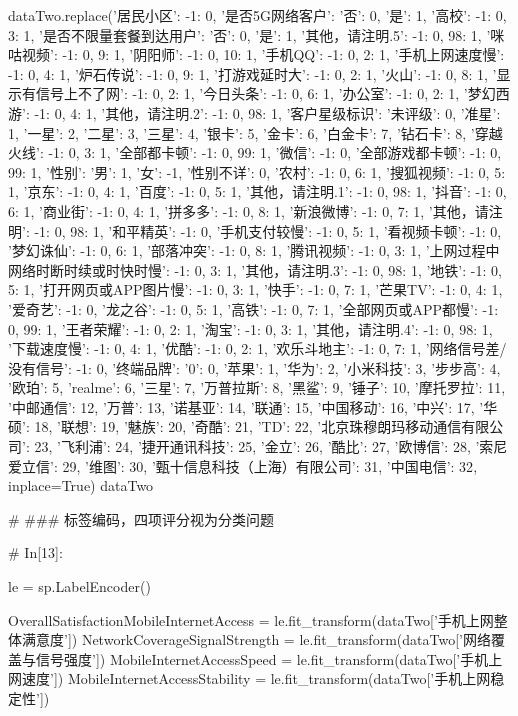 \documentclass{MathorCupmodeling}
\begin{document}
\begin{python}
	
	dataTwo.replace({'居民小区': {-1: 0}, '是否5G网络客户': {'否': 0, '是': 1}, '高校': {-1: 0, 3: 1}, '是否不限量套餐到达用户': {'否': 0, '是': 1}, '其他，请注明.5': {-1: 0, 98: 1}, '咪咕视频': {-1: 0, 9: 1}, '阴阳师': {-1: 0, 10: 1}, '手机QQ': {-1: 0, 2: 1}, '手机上网速度慢': {-1: 0, 4: 1}, '炉石传说': {-1: 0, 9: 1}, '打游戏延时大': {-1: 0, 2: 1}, '火山': {-1: 0, 8: 1}, '显示有信号上不了网': {-1: 0, 2: 1}, '今日头条': {-1: 0, 6: 1}, '办公室': {-1: 0, 2: 1}, '梦幻西游': {-1: 0, 4: 1}, '其他，请注明.2': {-1: 0, 98: 1}, '客户星级标识': {'未评级': 0, '准星': 1, '一星': 2, '二星': 3, '三星': 4, '银卡': 5, '金卡': 6, '白金卡': 7, '钻石卡': 8}, '穿越火线': {-1: 0, 3: 1}, '全部都卡顿': {-1: 0, 99: 1}, '微信': {-1: 0}, '全部游戏都卡顿': {-1: 0, 99: 1}, '性别': {'男': 1, '女': -1, '性别不详': 0}, '农村': {-1: 0, 6: 1}, '搜狐视频': {-1: 0, 5: 1}, '京东': {-1: 0, 4: 1}, '百度': {-1: 0, 5: 1}, '其他，请注明.1': {-1: 0, 98: 1}, '抖音': {-1: 0, 6: 1}, '商业街': {-1: 0, 4: 1}, '拼多多': {-1: 0, 8: 1}, '新浪微博': {-1: 0, 7: 1}, '其他，请注明': {-1: 0, 98: 1}, '和平精英': {-1: 0}, '手机支付较慢': {-1: 0, 5: 1}, '看视频卡顿': {-1: 0}, '梦幻诛仙': {-1: 0, 6: 1}, '部落冲突': {-1: 0, 8: 1}, '腾讯视频': {-1: 0, 3: 1}, '上网过程中网络时断时续或时快时慢': {-1: 0, 3: 1}, '其他，请注明.3': {-1: 0, 98: 1}, '地铁': {-1: 0, 5: 1}, '打开网页或APP图片慢': {-1: 0, 3: 1}, '快手': {-1: 0, 7: 1}, '芒果TV': {-1: 0, 4: 1}, '爱奇艺': {-1: 0}, '龙之谷': {-1: 0, 5: 1}, '高铁': {-1: 0, 7: 1}, '全部网页或APP都慢': {-1: 0, 99: 1}, '王者荣耀': {-1: 0, 2: 1}, '淘宝': {-1: 0, 3: 1}, '其他，请注明.4': {-1: 0, 98: 1}, '下载速度慢': {-1: 0, 4: 1}, '优酷': {-1: 0, 2: 1}, '欢乐斗地主': {-1: 0, 7: 1}, '网络信号差/没有信号': {-1: 0}, '终端品牌': {'0': 0, '苹果': 1, '华为': 2, '小米科技': 3, '步步高': 4, '欧珀': 5, 'realme': 6, '三星': 7, '万普拉斯': 8, '黑鲨': 9, '锤子': 10, '摩托罗拉': 11, '中邮通信': 12, '万普': 13, '诺基亚': 14, '联通': 15, '中国移动': 16, '中兴': 17, '华硕': 18, '联想': 19, '魅族': 20, '奇酷': 21, 'TD': 22, '北京珠穆朗玛移动通信有限公司': 23, '飞利浦': 24, '捷开通讯科技': 25, '金立': 26, '酷比': 27, '欧博信': 28, '索尼爱立信': 29, '维图': 30, '甄十信息科技（上海）有限公司': 31, '中国电信': 32}}, inplace=True)
	dataTwo
	
	# ### 标签编码，四项评分视为分类问题
	
	# In[13]:
	
	
	le = sp.LabelEncoder()
	
	OverallSatisfactionMobileInternetAccess = le.fit_transform(dataTwo['手机上网整体满意度'])
	NetworkCoverageSignalStrength = le.fit_transform(dataTwo['网络覆盖与信号强度'])
	MobileInternetAccessSpeed = le.fit_transform(dataTwo['手机上网速度'])
	MobileInternetAccessStability = le.fit_transform(dataTwo['手机上网稳定性'])
	

\end{python}
\end{document}
